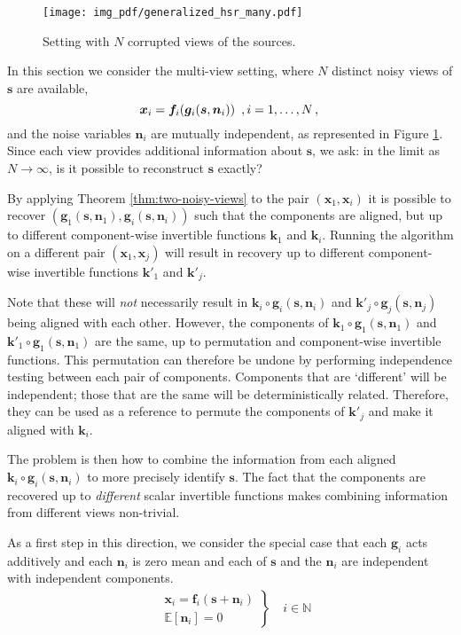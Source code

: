 \begin{figure}[t!]
	\centering
	\texttt{[image: img\_pdf/generalized\_hsr\_many.pdf]}
	\caption{Setting with $N$ corrupted views of the sources.}
	\label{fig:generalized_hsr_many}
\end{figure}

In this section we consider the multi-view setting, where $N$ distinct noisy views of $\bm{s}$ are available,
\begin{equation*}
\bm{x}_{i}=\bm{f}_{i}(\bm{g}_{i}(\bm{s},\bm{n}_{i}))\,\,\,,i=1, \ldots, N\,, \label{eq:multi}\\
\end{equation*}
and the noise variables $\bm{n}_{i}$ are mutually independent, as represented in Figure \ref{fig:generalized_hsr_many}.
Since each view provides additional information about $\bm{s}$, we ask: in the limit as $N \to \infty$, is it possible to reconstruct $\bm{s}$ exactly?


By applying Theorem \ref{thm:two-noisy-views} to the pair $(\bm{x}_1,\bm{x}_i)$ it is possible to recover  $(\bm{g}_1(\bm{s},\bm{n}_1),\bm{g}_i(\bm{s},\bm{n}_i))$ such that the components are aligned, but up to different component-wise invertible functions $\bm{k}_1$ and $\bm{k}_i$.
Running the algorithm on a different pair  $(\bm{x}_1,\bm{x}_{j})$ will result in recovery up to different component-wise invertible functions $\bm{k}'_1$ and $\bm{k}'_j$.

Note that these will \emph{not} necessarily result in  $\bm{k}_i\circ\bm{g}_i(\bm{s},\bm{n}_i)$ and $\bm{k}'_j\circ\bm{g}_j(\bm{s},\bm{n}_j)$ being aligned with each other.
However, the components of $\bm{k}_1\circ\bm{g}_1(\bm{s},\bm{n}_1)$ and $\bm{k}'_1\circ\bm{g}_1(\bm{s},\bm{n}_1)$ are the same, up to permutation and component-wise invertible functions.
This permutation can therefore be undone by performing independence testing between each pair of components.
Components that are `different' will be independent; those that are the same will be deterministically related.
Therefore, they can be used as a reference to permute the components of $\bm{k}'_j$ and make it aligned with $\bm{k}_i$.

The problem is then how to combine the information from each aligned $\bm{k}_i \circ \bm{g}_i(\bm{s},\bm{n}_i)$ to more precisely identify $\bm{s}$.
The fact that the components are recovered up to \emph{different} scalar invertible functions makes combining information from different views non-trivial.


As a first step in this direction, we consider the special case that each $\bm{g}_i$ acts additively and each $\bm{n}_i$ is zero mean and each of $\bm{s}$ and the $\bm{n}_i$ are independent with independent components.
\begin{align}
\left.
\begin{array}{ll}
&\bm{x}_{i}=\bm{f}_{i}(\bm{s} + \bm{n}_{i}) \\
&\mathbb{E}[\bm{n}_i]= 0
\end{array}
\right\rbrace \quad i \in \mathbb{N}
\end{align}

